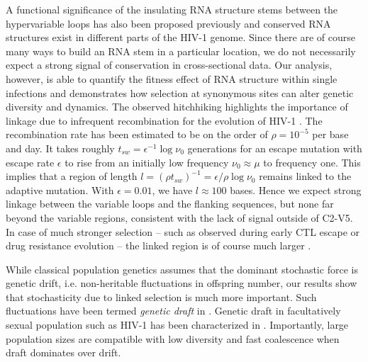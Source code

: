 \documentclass[rmp, twocolumn]{revtex4}
\newcommand{\shankaregion}{C2-V5}
\begin{document}
A functional significance of the insulating RNA structure stems between the
hypervariable loops has also been proposed previously
\citep{watts_architecture_2009, sanjuan_interplay_2011} and conserved RNA
structures exist in different parts of the HIV-1 genome. Since there are
of course many ways to build an RNA stem in a particular location, we do
not necessarily expect a strong signal of conservation in cross-sectional data. 
Our analysis, however, is able to
quantify the fitness effect of RNA structure within single infections and
demonstrates how selection at synonymous sites can alter genetic diversity and
dynamics. The observed hitchhiking highlights the importance of linkage due to
infrequent recombination for the evolution of HIV-1
\citep{neher_recombination_2010, batorsky_estimate_2011,
josefsson_majority_2011}. The recombination rate has been estimated to be on the
order of $\rho = 10^{-5}$ per base and day. It takes roughly $t_{sw} =
\epsilon^{-1} \log \nu_0$ generations for an escape mutation with escape rate
$\epsilon$ to rise from an initially low frequency $\nu_0\approx \mu$ to frequency
one. This implies that a region of length $l = (\rho t_{sw})^{-1} = \epsilon /
\rho \log \nu_0$ remains linked to the adaptive mutation. With $\epsilon=0.01$,
we have $l\approx 100$ bases. Hence we expect strong linkage between the
variable loops and the flanking sequences, but none far beyond the variable
regions, consistent with the lack of signal outside of \shankaregion. In case of
much stronger selection -- such as observed during early CTL escape or drug
resistance evolution -- the linked region is of course much larger
\citep{nijhuis_stochastic_1998}. 

While classical population genetics assumes that the dominant stochastic force
is genetic drift, i.e. non-heritable fluctuations in offspring number, our
results show that stochasticity due to linked selection is much more important.
Such fluctuations have been termed \emph{genetic draft} in
\citet{gillespie_genetic_2000}. Genetic draft in facultatively sexual population
such as HIV-1 has been characterized in \citep{neher_genetic_2011}. Importantly,
large population sizes are compatible with low diversity and fast coalescence
when draft dominates over drift.
\end{document}
